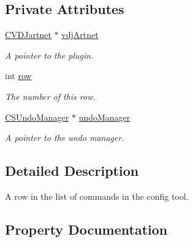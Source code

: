 \subsection*{Private Attributes}
\begin{DoxyCompactItemize}
\item 
\mbox{\label{classConfigWinRowString_a71a5621146c28fcbc9418079a15d367e}} 
\hyperlink{classCVDJartnet}{C\+V\+D\+Jartnet} $\ast$ \hyperlink{classConfigWinRowString_a71a5621146c28fcbc9418079a15d367e}{vdj\+Artnet}
\begin{DoxyCompactList}\small\item\em A pointer to the plugin. \end{DoxyCompactList}\item 
\mbox{\label{classConfigWinRowString_a6b3d9b4d2c7775ea440a52ef78697d87}} 
int \hyperlink{classConfigWinRowString_a6b3d9b4d2c7775ea440a52ef78697d87}{row}
\begin{DoxyCompactList}\small\item\em The number of this row. \end{DoxyCompactList}\item 
\mbox{\label{classConfigWinRowString_a3941099a204c34f3f76a9a582c8cfb8c}} 
\hyperlink{classCSUndoManager}{C\+S\+Undo\+Manager} $\ast$ \hyperlink{classConfigWinRowString_a3941099a204c34f3f76a9a582c8cfb8c}{undo\+Manager}
\begin{DoxyCompactList}\small\item\em A pointer to the undo manager. \end{DoxyCompactList}\end{DoxyCompactItemize}


\subsection{Detailed Description}
A row in the list of commands in the config tool. 

\subsection{Property Documentation}
\mbox{\label{classConfigWinRowString_ad8324c1c0df6f0069626c15119539e6c}} 
